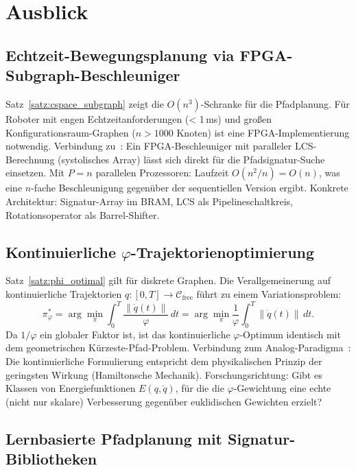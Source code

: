 ﻿\documentclass[a4paper,12pt]{article}
\theoremstyle{definition}
\newcommand{\Cfree}{\mathcal{C}_{\mathrm{free}}}
\begin{document}
\section{Ausblick}

\subsection{Echtzeit-Bewegungsplanung via FPGA-Subgraph-Beschleuniger}

Satz~\ref{satz:cspace_subgraph} zeigt die $O(n^3)$-Schranke f\"ur die
Pfadplanung. F\"ur Roboter mit engen Echtzeitanforderungen (< 1\,ms)
und gro{\ss}en Konfigurationsraum-Graphen ($n > 1000$ Knoten) ist eine
FPGA-Implementierung notwendig.
Verbindung zu~\cite{epp2026fpga}: Ein FPGA-Beschleuniger mit paralleler
LCS-Berechnung (systolisches Array) l\"asst sich direkt f\"ur die
Pfadsignatur-Suche einsetzen. Mit $P = n$ parallelen Prozessoren:
Laufzeit $O(n^2/n) = O(n)$, was eine $n$-fache Beschleunigung gegen\"uber
der sequentiellen Version ergibt.
Konkrete Architektur: Signatur-Array im BRAM, LCS als Pipelineschaltkreis,
Rotationsoperator als Barrel-Shifter.

\subsection{Kontinuierliche $\varphi$-Trajektorienoptimierung}

Satz~\ref{satz:phi_optimal} gilt f\"ur diskrete Graphen.
Die Verallgemeinerung auf kontinuierliche Trajektorien
$q: [0,T] \to \Cfree$ f\"uhrt zu einem Variationsproblem:
\[
\pi^*_\varphi = \arg\min_\pi \int_0^T \frac{\|\dot{q}(t)\|}{\varphi}\,dt
= \arg\min_\pi \frac{1}{\varphi} \int_0^T \|\dot{q}(t)\|\,dt.
\]
Da $1/\varphi$ ein globaler Faktor ist, ist das kontinuierliche
$\varphi$-Optimum identisch mit dem geometrischen K\"urzeste-Pfad-Problem.
Verbindung zum Analog-Paradigma~\cite{epp2026analog}:
Die kontinuierliche Formulierung entspricht dem physikalischen Prinzip
der geringsten Wirkung (Hamiltonsche Mechanik).
Forschungsrichtung: Gibt es Klassen von Energiefunktionen $E(q, \dot{q})$,
f\"ur die die $\varphi$-Gewichtung eine echte (nicht nur skalare) Verbesserung
gegen\"uber euklidischen Gewichten erzielt?

\subsection{Lernbasierte Pfadplanung mit Signatur-Bibliotheken}
\end{document}
